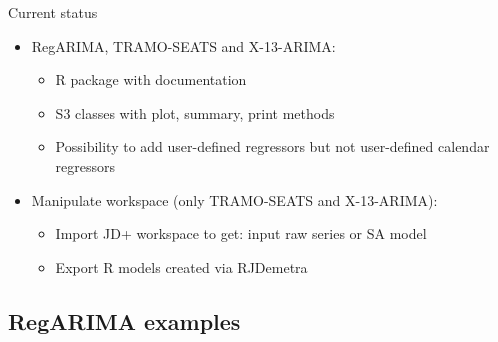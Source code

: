 \documentclass[10pt,xcolor=table,color={dvipsnames,usenames},ignorenonframetext,usepdftitle=false,french]{beamer}
\providecommand{\tightlist}{%
  \setlength{\parskip}{0pt}
  }
\begin{document}
\begin{frame}{Current status}

\begin{itemize}
\tightlist
\item
  RegARIMA, TRAMO-SEATS and X-13-ARIMA:

  \begin{itemize}
  \tightlist
  \item
    R package with documentation\\
  \item
    S3 classes with plot, summary, print methods
  \item
    Possibility to add user-defined regressors but not user-defined
    calendar regressors
  \end{itemize}
\item
  Manipulate workspace (only TRAMO-SEATS and X-13-ARIMA):

  \begin{itemize}
  \tightlist
  \item
    Import JD+ workspace to get: input raw series or SA model
  \item
    Export R models created via RJDemetra
  \end{itemize}
\end{itemize}

\end{frame}

\subsection{RegARIMA examples}\label{regarima-examples}
\end{document}
